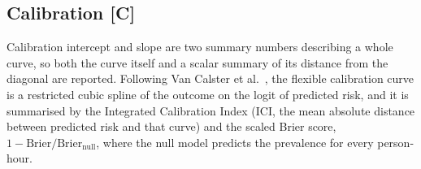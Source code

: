 \subsection{Calibration \texorpdfstring{[C]}{[C]}}
\label{sec:calibration_results}

Calibration intercept and slope are two summary numbers describing a whole
curve, so both the curve itself and a scalar summary of its distance from the
diagonal are reported. Following Van Calster et al.\
\cite{vancalster2019calibration}, the flexible calibration curve is a
restricted cubic spline of the outcome on the logit of predicted risk, and it
is summarised by the Integrated Calibration Index (ICI, the mean absolute
distance between predicted risk and that curve) and the scaled Brier score,
$1 - \text{Brier}/\text{Brier}_{\text{null}}$, where the null model predicts
the prevalence for every person-hour.

